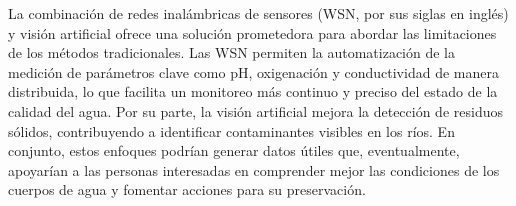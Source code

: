 

La combinación de redes inalámbricas de sensores (WSN, por sus siglas en inglés) y visión artificial ofrece una solución prometedora para abordar las limitaciones de los métodos tradicionales. Las WSN permiten la automatización de la medición de parámetros clave como pH, oxigenación y conductividad de manera distribuida, lo que facilita un monitoreo más continuo y preciso del estado de la calidad del agua. Por su parte, la visión artificial mejora la detección de residuos sólidos, contribuyendo a identificar contaminantes visibles en los ríos. En conjunto, estos enfoques podrían generar datos útiles que, eventualmente, apoyarían a las personas interesadas en comprender mejor las condiciones de los cuerpos de agua y fomentar acciones para su preservación.



